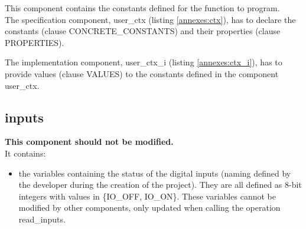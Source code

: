 This component contains the constants defined for the function to program. \\

The specification component, user\_ctx (listing \ref{annexes:ctx}), has to declare the constants (clause CONCRETE\_CONSTANTS) and their properties (clause PROPERTIES).



The implementation component, user\_ctx\_i (listing \ref{annexes:ctx_i}), has to provide values (clause VALUES) to the constants defined in the component user\_ctx.



\subsection{inputs}

\textbf{\color{ocre}This component should not be modified.} \\
It contains:
\begin{itemize}
    \item the variables containing the status of the digital inputs (naming defined by the developer during the creation of the project). They are all defined as 8-bit integers with values in \{IO\_OFF, IO\_ON\}. These variables cannot be modified by other components, only updated when calling the operation read\_inputs.
\end{itemize}
 

